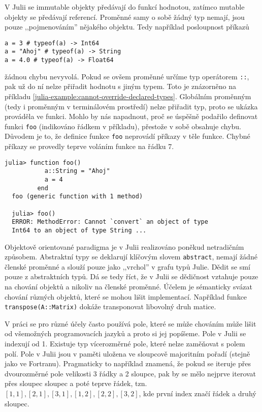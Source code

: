 V Julii se immutable objekty předávají do funkcí hodnotou, zatímco mutable objekty se předávají referencí. Proměnné samy o sobě žádný typ nemají, jsou pouze ,,pojmenováním'' nějakého objektu. Tedy například posloupnost příkazů
\begin{Verbatim}
a = 3 # typeof(a) -> Int64
a = "Ahoj" # typeof(a) -> String
a = 4.0 # typeof(a) -> Float64
\end{Verbatim}
žádnou chybu nevyvolá. Pokud se ovšem proměnné určíme typ operátorem \texttt{::}, pak už do ní nelze přiřadit hodnotu s jiným typem. Toto je znázorněno na příkladu \ref{julia-example:cannot-override-declared-types}. Globálním proměnným (tedy i proměnným v terminálovém prostředí) nelze přiřadit typ, proto se ukázka prováděla ve funkci. Mohlo by nás napadnout, proč se úspěšně podařilo definovat funkci \texttt{foo} (indikováno řádkem v příkladu), přestože v sobě obsahuje chybu. Důvodem je to, že definice funkce \texttt{foo} neprovádí příkazy v těle funkce. Chybné příkazy se provedly teprve voláním funkce na řádku 7.
\begin{lstlisting}[caption={Pokus o předefinování proměnné}, label={julia-example:cannot-override-declared-types}]
  julia> function foo()
           a::String = "Ahoj"
           a = 4
         end
  foo (generic function with 1 method)

  julia> foo()
  ERROR: MethodError: Cannot `convert` an object of type
  Int64 to an object of type String ...
\end{lstlisting}

Objektově orientované paradigma je v Julii realizováno poněkud netradičním způsobem. Abstraktní typy se deklarují klíčovým slovem \texttt{abstract}, nemají žádné členské proměnné a slouží pouze jako ,,vrchol'' v grafu typů Julie. Dědit se smí pouze z abstraktních typů. Dá se tedy říct, že v Julii se dědičnost vztahuje pouze na chování objektů a nikoliv na členské proměnné. Účelem je sémanticky svázat chování různých objektů, které se mohou lišit implementací. Například funkce \texttt{transpose(A::Matrix)} dokáže transponovat libovolný druh matice.

V práci se pro různé účely často používá pole, které se může chováním může lišit od všemožných programovacích jazyků a proto si jej popíšeme. Pole v Julii se indexují od 1. Existuje typ vícerozměrné pole, které nelze zaměňovat s polem polí. Pole v Julii jsou v paměti uložena ve sloupcově majoritním pořadí (stejně jako ve Fortranu). Pragmaticky to například znamená, že pokud se iteruje přes dvourozměrné pole velikosti 3 řádky a 2 sloupce, pak by se mělo nejprve iterovat přes sloupec sloupec a poté teprve řádek, tzn. $[1, 1], [2, 1], [3, 1], [1, 2], [2, 2], [3, 2]$, kde první index značí řádek a druhý sloupec. 

